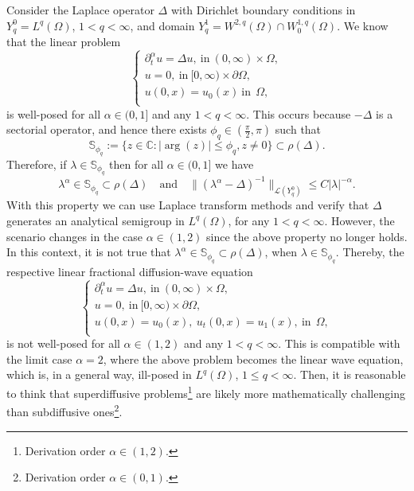 \documentclass[12pt,reqno]{amsart}
\newcommand{\C}{\mathbb{C}} %
\begin{document}
Consider the Laplace operator $\Delta$ with Dirichlet boundary conditions in $Y_{q}^{0}=L^q(\Omega)$, $1<q<\infty$, and domain  $Y_{q}^{1}=W^{2,q}(\Omega)\cap W_{0}^{1,q}(\Omega)$. We know that the linear problem  
$$	\left\{\begin{array}{lrr}
	\partial_t^{\alpha}u  = \Delta u, \ \mbox{in}\ (0,\infty)\times\Omega,\\	
	u  =  0, \ \mbox{in} \  [0,\infty)\times \partial\Omega,\\
	u(0,x)=u_0(x)\ \mbox{in}\ \ \Omega,\\
\end{array} \right.	
$$
is well-posed for all $\alpha\in(0,1]$ and any $1<q<\infty$. This occurs because $-\Delta$  is a sectorial operator, and hence there exists $\phi_q\in (\frac{\pi}{2}, 
\pi)$  such that $$\mathbb{S}_{\phi_q}:=\{z\in\C: |\arg(z)|\leq\phi_q, z\neq 0\}\subset\rho(\Delta).$$
Therefore,  if $\lambda\in\mathbb{S}_{\phi_q}$ then for all $\alpha\in(0,1]$ we have 
$$\lambda^{\alpha}\in\mathbb{S}_{\phi_q}\subset\rho(\Delta)\quad \mbox{and}\quad \|(\lambda^\alpha-\Delta)^{-1}\|_{\mathcal{L}(Y_{q}^{0})}\leq C|\lambda|^{-\alpha}.$$
With this property we can use Laplace transform methods and  verify that $\Delta$ generates an analytical semigroup in $L^q(\Omega)$, for any $1<q<\infty$. However, the scenario changes in the case $\alpha\in(1,2)$ since the above property no longer holds. In this context, it is not true that  
$\lambda^{\alpha}\in\mathbb{S}_{\phi_q}\subset\rho(\Delta)$, when $\lambda\in\mathbb{S}_{\phi_q}$.
Thereby, the respective linear fractional diffusion-wave equation
$$	\left\{\begin{array}{lrr}
	\partial_t^{\alpha}u  = \Delta u, \ \mbox{in}\ (0,\infty)\times\Omega,\\	
	u  =  0, \ \mbox{in} \  [0,\infty)\times \partial\Omega,\\
		u(0,x)=u_0(x),\ u_t(0,x)=u_1(x),\ \mbox{in}\ \ \Omega,\\
\end{array} \right.	
$$
is not well-posed for all $\alpha\in(1,2)$ and any $1<q<\infty$. This is compatible with the limit case $\alpha=2$, where the above problem becomes the linear wave equation, which is, in a general way,  ill-posed in $L^{q}(\Omega)$, $1\le q<\infty$. Then, it is reasonable to think that superdiffusive problems\footnote{ Derivation order $\alpha\in (1,2)$.} are likely more mathematically challenging than subdiffusive ones\footnote{ Derivation order $\alpha\in(0,1)$.}.
\end{document}
